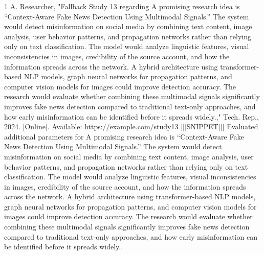 \documentclass[conference]{IEEEtran}
\begin{document}
\begin{thebibliography}{1}
A. Researcher, "Fallback Study 13 regarding A promising research idea is “Context-Aware Fake News Detection Using Multimodal Signals.” The system would detect misinformation on social media by combining text content, image analysis, user behavior patterns, and propagation networks rather than relying only on text classification. The model would analyze linguistic features, visual inconsistencies in images, credibility of the source account, and how the information spreads across the network. A hybrid architecture using transformer-based NLP models, graph neural networks for propagation patterns, and computer vision models for images could improve detection accuracy. The research would evaluate whether combining these multimodal signals significantly improves fake news detection compared to traditional text-only approaches, and how early misinformation can be identified before it spreads widely.," Tech. Rep., 2024. [Online]. Available: https://example.com/study13 |||SNIPPET||| Evaluated additional parameters for A promising research idea is “Context-Aware Fake News Detection Using Multimodal Signals.” The system would detect misinformation on social media by combining text content, image analysis, user behavior patterns, and propagation networks rather than relying only on text classification. The model would analyze linguistic features, visual inconsistencies in images, credibility of the source account, and how the information spreads across the network. A hybrid architecture using transformer-based NLP models, graph neural networks for propagation patterns, and computer vision models for images could improve detection accuracy. The research would evaluate whether combining these multimodal signals significantly improves fake news detection compared to traditional text-only approaches, and how early misinformation can be identified before it spreads widely..

\end{thebibliography}
\end{document}
